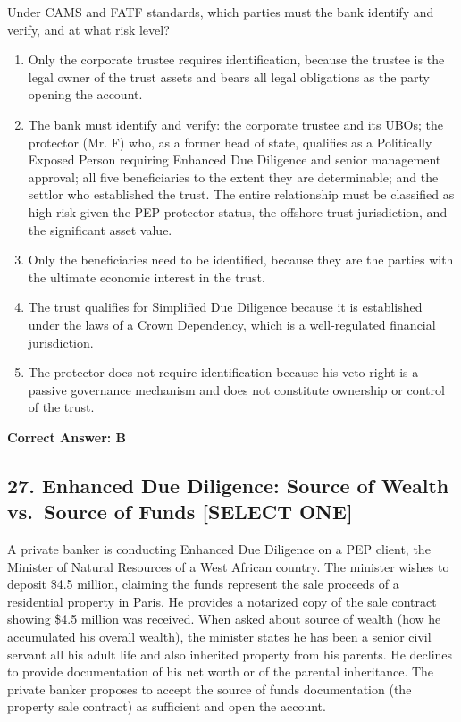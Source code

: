 \documentclass[11pt,a4paper]{article}
\begin{document}
	Under CAMS and FATF standards, which parties must the bank identify and verify, and at what risk level?
	
	\begin{enumerate}[label=\Alph*.]
		\item Only the corporate trustee requires identification, because the trustee is the legal owner of the trust assets and bears all legal obligations as the party opening the account.
		\item The bank must identify and verify: the corporate trustee and its UBOs; the protector (Mr. F) who, as a former head of state, qualifies as a Politically Exposed Person requiring Enhanced Due Diligence and senior management approval; all five beneficiaries to the extent they are determinable; and the settlor who established the trust. The entire relationship must be classified as high risk given the PEP protector status, the offshore trust jurisdiction, and the significant asset value.
		\item Only the beneficiaries need to be identified, because they are the parties with the ultimate economic interest in the trust.
		\item The trust qualifies for Simplified Due Diligence because it is established under the laws of a Crown Dependency, which is a well-regulated financial jurisdiction.
		\item The protector does not require identification because his veto right is a passive governance mechanism and does not constitute ownership or control of the trust.
	\end{enumerate}
	\textbf{Correct Answer: B}
	
	\subsection{27. Enhanced Due Diligence: Source of Wealth vs.\ Source of Funds \textnormal{[SELECT ONE]}}
	
	A private banker is conducting Enhanced Due Diligence on a PEP client, the Minister of Natural Resources of a West African country. The minister wishes to deposit \$4.5 million, claiming the funds represent the sale proceeds of a residential property in Paris. He provides a notarized copy of the sale contract showing \$4.5 million was received. When asked about source of wealth (how he accumulated his overall wealth), the minister states he has been a senior civil servant all his adult life and also inherited property from his parents. He declines to provide documentation of his net worth or of the parental inheritance. The private banker proposes to accept the source of funds documentation (the property sale contract) as sufficient and open the account.
	
\end{document}
